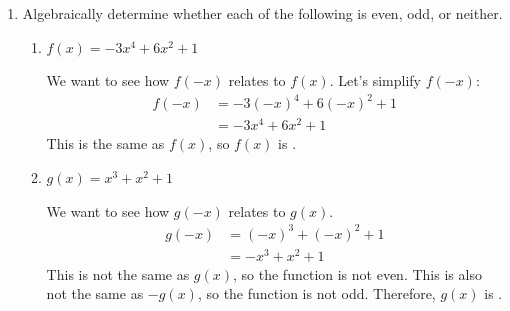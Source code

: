 \documentclass{article}
\begin{document}
\begin{enumerate}[resume]
\item  \label{even-odd-1}

  Algebraically determine whether each of the following is even, odd, or neither.
  \begin{enumerate}
  \item
    \begin{problem}[\vfill]
      $f(x) = -3x^4 + 6x^2 + 1$
    \end{problem}

    \begin{solution}
      We want to see how $f(-x)$ relates to $f(x)$.  Let's simplify
      $f(-x)$:
      \begin{align*}
        f(-x) &= -3 (-x)^4 + 6 (-x)^2 + 1\\
        &= -3 x^4 + 6x^2 + 1 
      \end{align*}
      This is the same as $f(x)$, so $f(x)$ is .
    \end{solution}

  \item
    \begin{problem}[\stretch{2}]
      $\displaystyle g(x) = x^3 + {x^2} + 1$
    \end{problem}

    \begin{solution}
      We want to see how $g(-x)$ relates to $g(x)$.
      \begin{align*}
        g(-x) &= (-x)^3 + {(-x)^2} + 1 \\
        &= -x^3 + x^2 + 1
      \end{align*}
      This is not the same as $g(x)$, so the function is not even.
      This is also not the same as $-g(x)$, so the function is not
      odd. Therefore, $g(x)$ is .
    \end{solution}
  \end{enumerate}

\end{enumerate}
\end{document}
